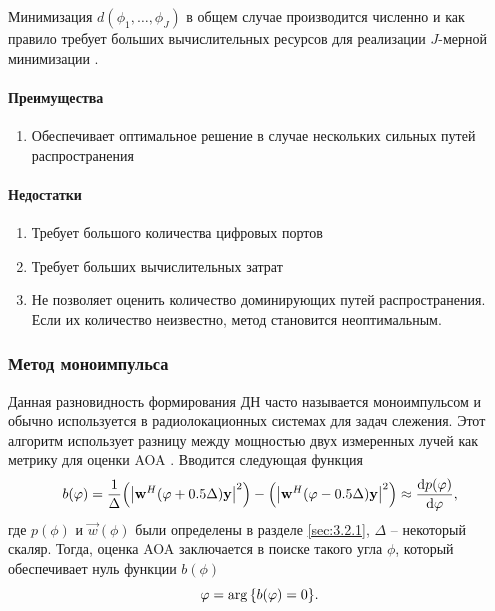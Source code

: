 Минимизация $d(\phi_1, \hdots, \phi_J)$ в общем случае производится численно и
как правило требует больших вычислительных ресурсов для реализации $J$-мерной
минимизации \cite{Tuncer2009}. 


\paragraph{Преимущества}%
\begin{enumerate}
    \item Обеспечивает оптимальное решение в случае нескольких сильных путей распространения 
\end{enumerate}

\paragraph{Недостатки}%
\begin{enumerate}
    \item Требует большого количества цифровых портов 
    \item Требует больших вычислительных затрат
    \item Не позволяет оценить количество доминирующих путей распространения. Если их количество неизвестно, метод становится неоптимальным. 
\end{enumerate}

\subsubsection{Метод моноимпульса}%
\label{sec:monopulse}

Данная разновидность формирования ДН часто называется моноимпульсом и обычно 
используется в радиолокационных системах для задач слежения. 
Этот алгоритм использует разницу между мощностью двух измеренных лучей как метрику для 
оценки AOA \cite{Tuncer2009}. Вводится следующая функция 
\begin{equation}
    \label{eq:3.11}
    b(\phi) = \frac{1}{\Delta} \qty(\abs{\vec w^H(\phi+0.5 \Delta)\vec y}^2)
    -
    \qty(\abs{\vec w^H(\phi-0.5 \Delta)\vec y}^2) \approx \dv{p(\phi)}{\phi} ,
\end{equation}
где $p(\phi)$ и $\vec w(\phi)$ были определены в разделе \ref{sec:3.2.1}, $\Delta$ -- некоторый скаляр. Тогда, оценка AOA
заключается в поиске такого угла $\phi$, который обеспечивает нуль функции $b(\phi)$
\begin{equation}
    \label{eq:3.12}
    \varphi = \arg\qty{b(\varphi) = 0}.
\end{equation}

